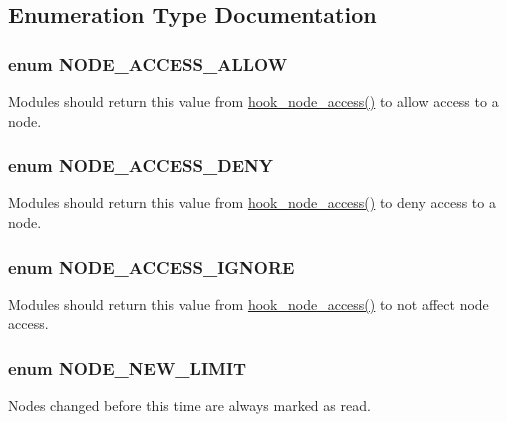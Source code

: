 \subsection{Enumeration Type Documentation}
\hypertarget{node_8module_a16f564e82cb41ddf7e687beb504073e7}{
\subsubsection[{NODE\_\-ACCESS\_\-ALLOW}]{\setlength{\rightskip}{0pt plus 5cm}enum {\bf NODE\_\-ACCESS\_\-ALLOW}}}
\label{node_8module_a16f564e82cb41ddf7e687beb504073e7}
Modules should return this value from \hyperlink{group__node__access_ga75a280ea1fbe0fb6ca034f8aad06d58d}{hook\_\-node\_\-access()} to allow access to a node. \hypertarget{node_8module_a1cad8c8efaaa44b3c98e77003786badc}{
\subsubsection[{NODE\_\-ACCESS\_\-DENY}]{\setlength{\rightskip}{0pt plus 5cm}enum {\bf NODE\_\-ACCESS\_\-DENY}}}
\label{node_8module_a1cad8c8efaaa44b3c98e77003786badc}
Modules should return this value from \hyperlink{group__node__access_ga75a280ea1fbe0fb6ca034f8aad06d58d}{hook\_\-node\_\-access()} to deny access to a node. \hypertarget{node_8module_a4155eb36a6910c7473f9a15e247a2142}{
\subsubsection[{NODE\_\-ACCESS\_\-IGNORE}]{\setlength{\rightskip}{0pt plus 5cm}enum {\bf NODE\_\-ACCESS\_\-IGNORE}}}
\label{node_8module_a4155eb36a6910c7473f9a15e247a2142}
Modules should return this value from \hyperlink{group__node__access_ga75a280ea1fbe0fb6ca034f8aad06d58d}{hook\_\-node\_\-access()} to not affect node access. \hypertarget{node_8module_af5fe4efd69d052f89ff8a0cf277081d3}{
\subsubsection[{NODE\_\-NEW\_\-LIMIT}]{\setlength{\rightskip}{0pt plus 5cm}enum {\bf NODE\_\-NEW\_\-LIMIT}}}
\label{node_8module_af5fe4efd69d052f89ff8a0cf277081d3}
Nodes changed before this time are always marked as read.

